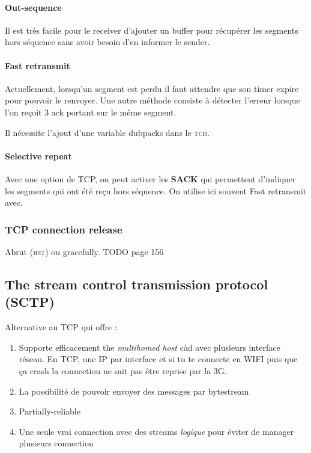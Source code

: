 \paragraph{Out-sequence}
Il est très facile pour le receiver d'ajouter un buffer pour récupérer les
segments hors séquence sans avoir besoin d'en informer le sender.

\paragraph{Fast retransmit}
Actuellement, lorsqu'un segment est perdu il faut attendre que son timer expire
pour pouvoir le renvoyer. Une autre méthode consiste à détecter l'erreur lorsque
l'on reçoit 3 ack portant sur le même segment.

Il nécessite l'ajout d'une variable dubpacks dans le \textsc{tcb}.

\paragraph{Selective repeat}
Avec une option de TCP, on peut activer les \textbf{SACK} qui permettent d'indiquer
les segments qui ont été reçu hors séquence. On utilise ici souvent Fast retransmit avec.

\subsubsection{TCP connection release}
Abrut (\textsc{rst}) ou gracefully.
TODO page 156

\subsection{The stream control transmission protocol (SCTP) }
Alternative au TCP qui offre :
\begin{enumerate}
    \item Supporte efficacement the \textit{multihomed host} càd avec plusieurs interface réseau. En TCP, une IP par interface et si tu te connecte en WIFI puis que ça
        crash la connection ne sait pas être reprise par la 3G.
    \item La possibilité de pouvoir envoyer des messages par bytestream
    \item Partially-reliable
    \item Une seule vrai connection avec des streams \textit{logique} pour éviter de manager
        plusieurs connection
\end{enumerate}

